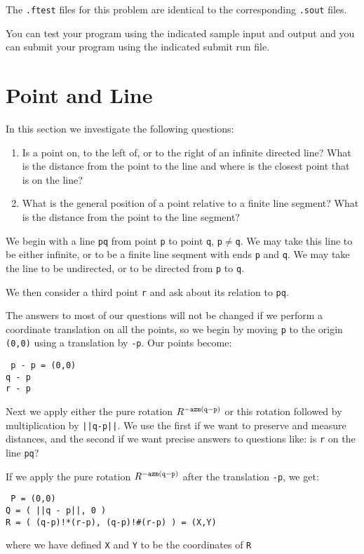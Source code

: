 \documentclass[12pt]{article}
\begin{document}
The {\tt .ftest} files for this problem are identical
to the corresponding {\tt .sout} files.

You can test your program using the indicated sample input and
output and you can submit your program using the indicated submit
run file.

\newpage

\section{Point and Line}\label{POINT-AND-LINE}
In this section we investigate the following questions:
\begin{enumerate}
\item Is a point on, to the left of, or to the right of
an infinite directed line?  What is the distance from the
point to the line and where is the closest point that is
on the line?
\item What is the general position of a point relative
to a finite line segment?  What is the distance from the
point to the line segment?
\end{enumerate}

We begin with a line {\tt pq} from point {\tt p} to point {\tt q},
{\tt p$\neq$q}.
We may take this line to be either infinite, or to be a finite
line seqment with ends {\tt p} and {\tt q}.  We may take the
line to be undirected, or to be directed from {\tt p} to {\tt q}.

We then consider a third point {\tt r} and ask about its relation
to {\tt pq}.

The answers to most of our questions will not be changed if we perform
a coordinate translation on all the points, so we begin by moving
{\tt p} to the origin {\tt (0,0)} using a translation by {\tt -p}.
Our points become:
\begin{center} \tt
p - p = (0,0) \\
q - p \\
r - p
\end{center}
Next we apply either the pure rotation $R^{\tt -azm(q-p)}$
or this rotation followed by multiplication by {\tt ||q-p||}.  We use
the first if we want to preserve and measure distances, and the
second if we want precise answers to questions like: is {\tt r} on the
line {\tt pq}?

If we apply the pure rotation $R^{\tt -azm(q-p)}$ after the translation
{\tt -p}, we get:
\begin{center} \tt
P = (0,0) \\
Q = ( ||q - p||, 0 ) \\
R = ( (q-p)!*(r-p), (q-p)!\#(r-p) ) = (X,Y)
\end{center}
where we have defined {\tt X} and {\tt Y} to be the coordinates of {\tt R}
\end{document}
